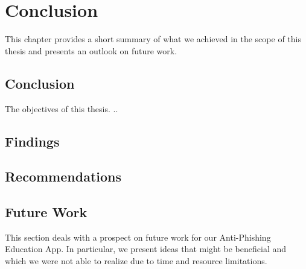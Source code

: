 \section{Conclusion}
\label{s:conclusion}

This chapter provides a short summary of what we achieved in the scope of this thesis and presents an outlook on future work.

\subsection{Conclusion}

The objectives of this thesis.
.. 

\subsection{Findings}
\subsection{Recommendations}
\subsection{Future Work}
This section deals with a prospect on future work for our Anti-Phishing Education App.
 In particular, we present ideas that might be beneficial and which we were not able to realize due to time and resource limitations.
